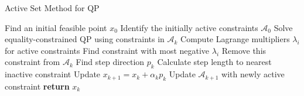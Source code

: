 \begin{algorithm}[H]
    \caption{Active Set Method for QP}
    \begin{algorithmic}[1]
        \State Find an initial feasible point $x_0$
        \State Identify the initially active constraints $\mathcal{A}_0$
            \State Solve equality-constrained QP using constraints in $\mathcal{A}_k$
            \State Compute Lagrange multipliers $\lambda_i$ for active constraints
                \State Find constraint with most negative $\lambda_i$
                \State Remove this constraint from $\mathcal{A}_k$
            \Else
                \State Find step direction $p_k$
                \State Calculate step length to nearest inactive constraint
                \State Update $x_{k+1} = x_k + \alpha_k p_k$
                \State Update $\mathcal{A}_{k+1}$ with newly active constraint
            \EndIf
                \State \textbf{return} $x_k$
            \EndIf
        \EndFor
    \end{algorithmic}
\end{algorithm}
